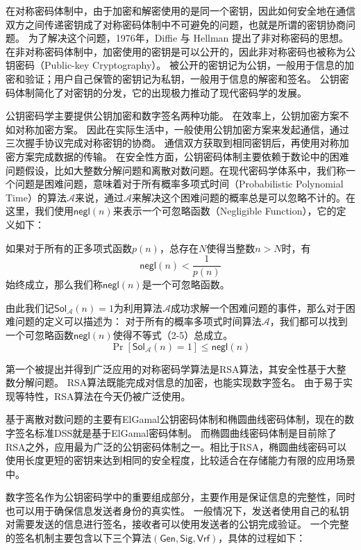 在对称密码体制中，由于加密和解密使用的是同一个密钥，因此如何安全地在通信双方之间传递密钥成了对称密码体制中不可避免的问题，也就是所谓的密钥协商问题。
为了解决这个问题，1976年，Diffie 与 Hellman 提出了非对称密码的思想\cite{diffie1976new}。
在非对称密码体制中，加密使用的密钥是可以公开的，因此非对称密码也被称为公钥密码（Public-key Cryptography）。
被公开的密钥记为公钥，一般用于信息的加密和验证；用户自己保管的密钥记为私钥，一般用于信息的解密和签名。
公钥密码体制简化了对密钥的分发，它的出现极力推动了现代密码学的发展。

公钥密码学主要提供公钥加密和数字签名两种功能。
在效率上，公钥加密方案不如对称加密方案。
因此在实际生活中，一般使用公钥加密方案来发起通信，通过三次握手协议完成对称密钥的协商。
通信双方获取到相同密钥后，再使用对称加密方案完成数据的传输。
在安全性方面，公钥密码体制主要依赖于数论中的困难问题假设，比如大整数分解问题和离散对数问题。在现代密码学体系中，我们称一个问题是困难问题，意味着对于所有概率多项式时间（Probabilistic Polynomial Time）的算法$\mathcal{A}$来说，通过$\mathcal{A}$来解决这个困难问题的概率总是可以忽略不计的。在这里，我们使用$\mathsf{negl}(n)$来表示一个可忽略函数（Negligible Function），它的定义如下：

如果对于所有的正多项式函数$p(n)$，总存在$N$使得当整数$n>N$时，有
\begin{equation}
\mathsf{negl}(n)<\frac{1}{p(n)}
\end{equation}
始终成立，那么我们称$\mathsf{negl}(n)$是一个可忽略函数。

由此我们记$\mathsf{Sol}_{\mathcal{A}}(n)=1$为利用算法$\mathcal{A}$成功求解一个困难问题的事件，那么对于困难问题的定义可以描述为：
对于所有的概率多项式时间算法$\mathcal{A}$，我们都可以找到一个可忽略函数$\mathsf{negl}(n)$使得不等式（2-5）总成立。
\begin{equation}
\Pr[\mathsf{Sol}_\mathcal{A}(n)=1]\leq\mathsf{negl}(n)
\end{equation}

第一个被提出并得到广泛应用的对称密码学算法是RSA算法，其安全性基于大整数分解问题。
RSA算法既能完成对信息的加密，也能实现数字签名\cite{rivest1978method}。
由于易于实现等特性，RSA算法在今天仍被广泛使用。

基于离散对数问题的主要有ElGamal公钥密码体制和椭圆曲线密码体制，现在的数字签名标准DSS就是基于ElGamal密码体制。
而椭圆曲线密码体制是目前除了RSA之外，应用最为广泛的公钥密码体制之一。相比于RSA，椭圆曲线密码可以使用长度更短的密钥来达到相同的安全程度，比较适合在存储能力有限的应用场景中。

数字签名作为公钥密码学中的重要组成部分，主要作用是保证信息的完整性，同时也可以用于确保信息发送者身份的真实性。
一般情况下，发送者使用自己的私钥对需要发送的信息进行签名，接收者可以使用发送者的公钥完成验证。
一个完整的签名机制主要包含以下三个算法$(\mathsf{Gen},\mathsf{Sig},\mathsf{Vrf})$，具体的过程如下：


